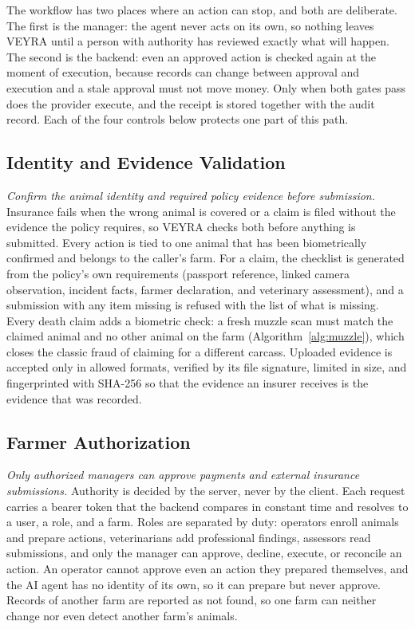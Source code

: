 \documentclass[11pt,letterpaper]{article}
\begin{document}
The workflow has two places where an action can stop, and both are deliberate. The first is the manager: the agent never acts on its own, so nothing leaves VEYRA until a person with authority has reviewed exactly what will happen. The second is the backend: even an approved action is checked again at the moment of execution, because records can change between approval and execution and a stale approval must not move money. Only when both gates pass does the provider execute, and the receipt is stored together with the audit record. Each of the four controls below protects one part of this path.

\subsection{Identity and Evidence Validation}

\emph{Confirm the animal identity and required policy evidence before submission.} Insurance fails when the wrong animal is covered or a claim is filed without the evidence the policy requires, so VEYRA checks both before anything is submitted. Every action is tied to one animal that has been biometrically confirmed and belongs to the caller's farm. For a claim, the checklist is generated from the policy's own requirements (passport reference, linked camera observation, incident facts, farmer declaration, and veterinary assessment), and a submission with any item missing is refused with the list of what is missing. Every death claim adds a biometric check: a fresh muzzle scan must match the claimed animal and no other animal on the farm (Algorithm~\ref{alg:muzzle}), which closes the classic fraud of claiming for a different carcass. Uploaded evidence is accepted only in allowed formats, verified by its file signature, limited in size, and fingerprinted with SHA-256 so that the evidence an insurer receives is the evidence that was recorded.

\subsection{Farmer Authorization}

\emph{Only authorized managers can approve payments and external insurance submissions.} Authority is decided by the server, never by the client. Each request carries a bearer token that the backend compares in constant time and resolves to a user, a role, and a farm. Roles are separated by duty: operators enroll animals and prepare actions, veterinarians add professional findings, assessors read submissions, and only the manager can approve, decline, execute, or reconcile an action. An operator cannot approve even an action they prepared themselves, and the AI agent has no identity of its own, so it can prepare but never approve. Records of another farm are reported as not found, so one farm can neither change nor even detect another farm's animals.
\end{document}
